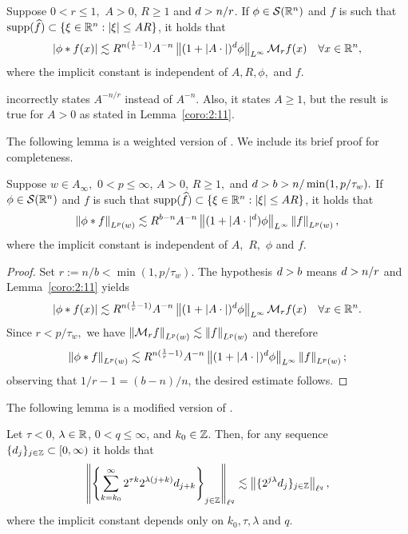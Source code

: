  
\begin{lemma}\label{coro:2:11}
Suppose $0 < r \leq 1,$  $A >0$, $R \geq 1$ and $d > n/r$. If $\phi \in {\mathcal{S}}({{\mathbb R}^n})$ and $f$ is such that  ${\rm{supp}}(\widehat{f}) \subset \{\xi\in{{\mathbb R}^n}:\left\vert \xi \right\vert\le AR\}$, it holds that
\begin{equation*}
|\phi * f(x)| \lesssim R^{n (\frac{1}{r}  -1)} A^{-n} \left\|(1 + |A \cdot|)^d \phi\right\|_{L^\infty}  \mathcal{M}_rf(x) \quad \forall x \in {{\mathbb R}^n},
\end{equation*}
where the implicit constant is independent of $A, R, \phi,$ and $f.$  
\end{lemma}
\begin{remark} \cite[Corollary 2.11]{MR837335} incorrectly states $A^{-n/r}$ instead of $ A^{-n}$. Also, it states $A \geq 1$, but the result is true for $A >0$ as stated in Lemma~\ref{coro:2:11}.
\end{remark}

The following lemma is a weighted version of   \cite[Corollary 2.12 (1)]{MR837335}. We include its brief proof for completeness.
\begin{lemma}\label{coro:2:12(1)}
Suppose $w\in A_\infty,$ $0 < p \leq \infty$, $A > 0$, $R \geq 1,$  and $d > b > n/ \min(1,p/\tau_w).$  If $\phi \in {\mathcal{S}}({{\mathbb R}^n})$ and $f$ is such that ${\rm{supp}}(\widehat{f}) \subset \{\xi\in{{\mathbb R}^n}:\left\vert \xi \right\vert\le AR\}$, it holds that
\begin{equation*}
\left\|\phi * f\right\|_{L^{p}(w)} \lesssim R^{b - n} A^{-n} \left\|(1 + |A \cdot|^d) \phi\right\|_{L^\infty} \left\|f\right\|_{L^{p}(w)},
\end{equation*}
where the implicit constant is independent of $A,$ $R,$ $\phi$ and $f.$ 
\end{lemma}


\begin{proof}  Set $r:=n/b < \min(1, p/\tau_w).$ The hypothesis $d > b$  means $ d  > n/r$ and Lemma~\ref{coro:2:11}  yields
$$
|\phi * f(x)| \lesssim R^{n (\frac{1}{r} -1)} A^{-n} \left\|(1 + |A \cdot|)^d \phi\right\|_{L^\infty}  \mathcal{M}_rf(x) \quad \forall x \in {{\mathbb R}^n}.
$$
Since $r < p/\tau_w,$ we have   $\left\|\mathcal{M}_rf\right\|_{L^{p}(w)} \lesssim \left\|f\right\|_{L^{p}(w)}$ and therefore
$$
\left\|\phi * f\right\|_{L^{p}(w)} \lesssim R^{n (\frac{1}{r} -1)} A^{-n} \left\|(1 + |A \cdot|)^d \phi\right\|_{L^\infty} \left\|f\right\|_{L^{p}(w)};
$$
observing that $1/r -1 = (b -n)/n$, the desired estimate follows. 
\end{proof}


The following lemma is a modified version of \cite[Lemma 3.8]{MR837335}.
\begin{lemma}\label{eq:seriesineq} Let  $\tau < 0$, $\lambda \in \mathbb{R}$, $0 < q \leq \infty$, and $k_0 \in \mathbb{Z}$. Then, for any sequence $\{d_j\}_{j \in \mathbb{Z}} \subset [0, \infty)$ it holds that
\begin{equation*}
\left\|\left\{\sum_{k=k_0}^\infty 2^{\tau k} 2^{\lambda(j+k)}d_{j+k}\right\}_{j\in\mathbb{Z}}\right\|_{\ell^q} \lesssim \left\|\{2^{j \lambda} d_j\}_{j\in\mathbb{Z}}\right\|_{\ell^q},
\end{equation*}
where the implicit constant depends only on $k_0, \tau, \lambda$ and $q$.
\end{lemma}




